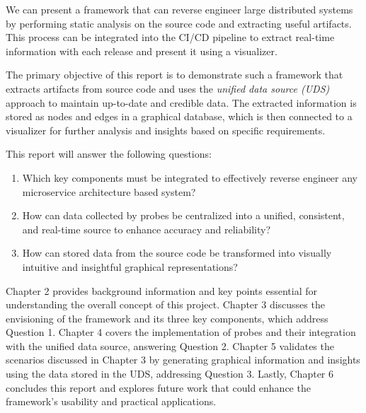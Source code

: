 We can present a framework that can reverse engineer large distributed systems by performing static analysis on the source code and extracting useful artifacts. This process can be integrated into the CI/CD pipeline to extract real-time information with each release and present it using a visualizer. 

The primary objective of this report is to demonstrate such a framework that extracts artifacts from source code and uses the \textit{unified data source (UDS)} approach to maintain up-to-date and credible data. The extracted information is stored as nodes and edges in a graphical database, which is then connected to a visualizer for further analysis and insights based on specific requirements.

This report will answer the following questions:
\begin{enumerate}
    \item Which key components must be integrated to effectively reverse engineer any microservice architecture based system?
    \item How can data collected by probes be centralized into a unified, consistent, and real-time source to enhance accuracy and reliability?
    \item How can stored data from the source code be transformed into visually intuitive and insightful graphical representations?
\end{enumerate}

Chapter 2 provides background information and key points essential for understanding the overall concept of this project. Chapter 3 discusses the envisioning of the framework and its three key components, which address Question 1. Chapter 4 covers the implementation of probes and their integration with the unified data source, answering Question 2. Chapter 5 validates the scenarios discussed in Chapter 3 by generating graphical information and insights using the data stored in the UDS, addressing Question 3. Lastly, Chapter 6 concludes this report and explores future work that could enhance the framework's usability and practical applications.
